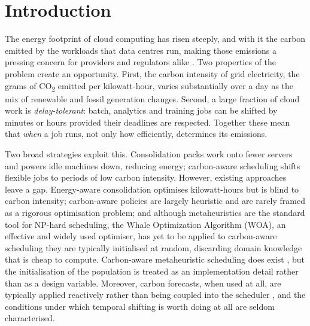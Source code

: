 \documentclass[12pt,a4paper]{article}
\providecommand{\DIFaddtex}[1]{{\protect\color{blue} \sf #1}} %
\providecommand{\DIFdeltex}[1]{{\protect\color{red} \scriptsize #1}} %
\providecommand{\DIFaddbegin}{} %
\providecommand{\DIFaddend}{} %
\providecommand{\DIFdelbegin}{} %
\providecommand{\DIFdelend}{} %
\providecommand{\DIFadd}[1]{\texorpdfstring{\DIFaddtex{#1}}{#1}} %
\providecommand{\DIFdel}[1]{\texorpdfstring{\DIFdeltex{#1}}{}} %
\providecommand{\DIFscaledelfig}{0.5}
\newlength{\DIFdelgraphicswidth} %
\newlength{\DIFdelgraphicsheight} %
\providecommand{\DIFaddincludegraphics}[2][]{{\color{blue}\fbox{\DIFOincludegraphics[#1]{#2}}}} %
\providecommand{\DIFdelincludegraphics}[2][]{%
\sbox{\DIFdelgraphicsbox}{\DIFOincludegraphics[#1]{#2}}%
\settoboxwidth{\DIFdelgraphicswidth}{\DIFdelgraphicsbox} %
\settoboxtotalheight{\DIFdelgraphicsheight}{\DIFdelgraphicsbox} %
\scalebox{\DIFscaledelfig}{%
\parbox[b]{\DIFdelgraphicswidth}{\usebox{\DIFdelgraphicsbox}\\[-\baselineskip] \rule{\DIFdelgraphicswidth}{0em}}\llap{\resizebox{\DIFdelgraphicswidth}{\DIFdelgraphicsheight}{%
\setlength{\unitlength}{\DIFdelgraphicswidth}%
\begin{picture}(1,1)%
\thicklines\linethickness{2pt} %
{\color[rgb]{1,0,0}\put(0,0){\framebox(1,1){}}}%
{\color[rgb]{1,0,0}\put(0,0){\line( 1,1){1}}}%
{\color[rgb]{1,0,0}\put(0,1){\line(1,-1){1}}}%
\end{picture}%
}\hspace*{3pt}}} %
} %
\DeclareRobustCommand{\DIFaddbegin}{\DIFOaddbegin \let\includegraphics\DIFaddincludegraphics} %
\DeclareRobustCommand{\DIFaddend}{\DIFOaddend \let\includegraphics\DIFOincludegraphics} %
\DeclareRobustCommand{\DIFdelbegin}{\DIFOdelbegin \let\includegraphics\DIFdelincludegraphics} %
\DeclareRobustCommand{\DIFdelend}{\DIFOaddend \let\includegraphics\DIFOincludegraphics} %
\begin{document}
\DIFaddend \section{Introduction}\label{sec:intro}
The energy footprint of cloud computing has risen steeply, and with it the carbon emitted by the workloads that
data centres run, making those emissions a pressing concern for providers and regulators alike
\cite{radovanovic2023carbon, dodge2022measuring}. Two properties of the problem create an opportunity. First, the carbon intensity of grid
electricity, the grams of CO\textsubscript{2} emitted per kilowatt-hour, varies substantially over a day
as the mix of renewable and fossil generation changes. Second, a large fraction of cloud work is
\emph{delay-tolerant}: batch, analytics and training jobs can be shifted by minutes or hours provided their
deadlines are respected. Together these mean that \emph{when} a job runs, not only how efficiently, determines
its emissions.

Two broad strategies exploit this. Consolidation packs work onto fewer servers and powers idle machines down,
reducing energy; carbon-aware scheduling shifts flexible jobs to periods of low carbon intensity. However,
existing approaches leave a gap. Energy-aware consolidation optimises kilowatt-hours but is blind to carbon
intensity; carbon-aware policies are largely heuristic and are rarely framed as a rigorous optimisation
problem; and although metaheuristics are the standard tool for NP-hard scheduling, \DIFdelbegin \DIFdel{the Whale Optimization
Algorithm (WOA), an effective and widely used optimiser, has yet to be applied to carbon-aware
scheduling }\DIFdelend \DIFaddbegin \DIFadd{they are typically initialised at
random, discarding domain knowledge that is cheap to compute. Carbon-aware metaheuristic scheduling does exist
\cite{abbasikhazaei2022energy, khodayarseresht2023energy, miao2024energy, danach2026carbon, ruparel2026carbon},
but the initialisation of the population is treated as an implementation detail rather than as a design
variable}\DIFaddend . Moreover, carbon forecasts, when used at all, are typically applied reactively rather than being
coupled into the scheduler\DIFaddbegin \DIFadd{, and the conditions under which temporal shifting is worth doing at all are seldom
characterised}\DIFaddend .
\end{document}
